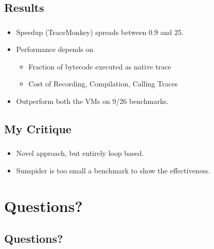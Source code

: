 \documentclass[mathserif,10pt]{beamer}
\newcommand{\cmt}[1]{}
\begin{document}
\subsection{Results}
\frame
{
  \frametitle{\subsecname}
  \begin{itemize}
    \item Speedup (TraceMonkey) spreads between 0.9 and 25. 
    \item Performance depends on
    \begin{itemize}
      \item Fraction of bytecode executed as native trace
      \item Cost of Recording, Compilation, Calling Traces
      \cmt{good perf when where VM spends majority of time running native code}
    \end{itemize}
    \item Outperform both the VMs on 9/26 benchmarks.
  \end{itemize}
}

\subsection{My Critique}
\frame
{
  \frametitle{\subsecname}
  \begin{itemize}
    \item Novel approach, but entirely loop based. 
    \item Sunspider is too small a benchmark to show the effectiveness.
    \cmt{
      This method will works if there exist long trip count loops in the program, which is not
usual in real web pages ... it is mostly method driven... but these will be help ful in
online gaming or google maps which do have long loops
    }
  \end{itemize}
}

\section{Questions?}
\subsection{Questions?}
\frame
{}
\end{document}
